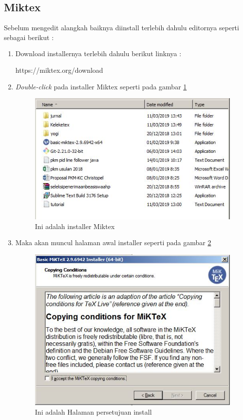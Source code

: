 \subsection{Miktex}
Sebelum mengedit alangkah baiknya diinstall terlebih dahulu editornya seperti sebagai berikut :
\begin{enumerate}
	\item Download installernya terlebih dahulu berikut linknya :
\par https://miktex.org/download
	\item \textit{Double-click} pada installer Miktex seperti pada gambar \ref{fig:installer}
		 \begin{figure}[!htbp]
  		 \centering
 		 \includegraphics[width=.75\textwidth]{figures/Miktex/installer.JPG}
  		 \caption{Ini adalah installer Miktex}\label{fig:installer}
		 \end{figure}
	\item Maka akan muncul halaman awal installer seperti pada gambar  \ref{fig:agreement}
		 \begin{figure}[!htbp]
  		 \centering
 		 \includegraphics[width=.75\textwidth]{figures/Miktex/agreement.JPG}
  		 \caption{Ini adalah Halaman persetujuan install}\label{fig:agreement}

\end{figure}
\end{enumerate}
